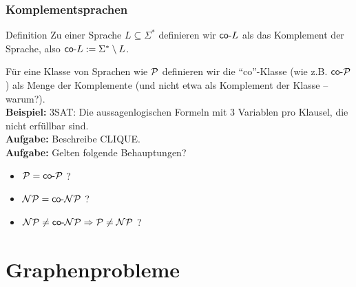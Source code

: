 \begin{frame}
\frametitle{Komplementsprachen}
\begin{block}{Definition}
Zu einer Sprache $L \subseteq \Sigma^*$ definieren wir $\mathsf{co\text{-}} L$ als das Komplement der Sprache, also
$\mathsf{co\text{-}} L := \Sigma^*\setminus L$.
\end{block}
Für eine Klasse von Sprachen wie $\mathcal{P}$ definieren wir die "`co"'-Klasse (wie z.B. $\mathsf{co\text{-}}\mathcal{P}$) als Menge der Komplemente (und nicht etwa als Komplement der Klasse -- warum?).\\[8pt]
\pause
\textbf{Beispiel:} \co 3SAT: Die aussagenlogischen Formeln mit 3 Variablen pro Klausel, die nicht erfüllbar sind.\\[8pt]

\pause
\textbf{Aufgabe:} Beschreibe \co CLIQUE.\\[8pt] %

\pause
\textbf{Aufgabe:} Gelten folgende Behauptungen?
\begin{itemize}
    \item $\mathcal{P} = \mathsf{co\text{-}}\mathcal{P}$ ?
    \item $\mathcal{NP} = \mathsf{co\text{-}}\mathcal{NP}$ ?
    \invincible \pause
    \item $\mathcal{NP} \neq \mathsf{co\text{-}}\mathcal{NP} \Rightarrow \mathcal{P} \neq \mathcal{NP}$ ?
    \vincible
\end{itemize}
\end{frame}

\section{Graphenprobleme}
\subsection{}

